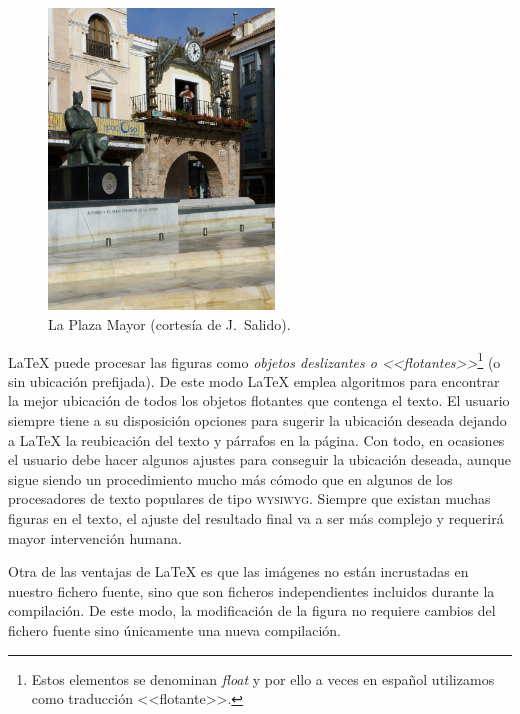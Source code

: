 \documentclass[11pt,a4paper]{article}
\begin{document}
\begin{figure}[hbt] %
	\centering %
	\includegraphics[height=8cm]{plazaCR} %
	\caption[Ejemplo de foto en formato jpg]{La Plaza Mayor (cortesía de J.~Salido).} %
	\label{fig:plazaCR} %
\end{figure}

\LaTeX{} puede procesar las figuras como \emph{objetos deslizantes o <<flotantes>>}\footnote{Estos elementos se denominan \textit{float} y por ello a veces en español utilizamos como traducción <<flotante>>.} (o sin ubicación prefijada). De este modo \LaTeX{} emplea algoritmos para encontrar la mejor ubicación de todos los objetos flotantes que contenga el texto. El usuario siempre tiene a su disposición opciones para sugerir la ubicación deseada dejando a \LaTeX{} la reubicación del texto y párrafos en la página. Con todo, en ocasiones el usuario debe hacer algunos ajustes para conseguir la ubicación deseada, aunque sigue siendo un procedimiento mucho más cómodo que en algunos de los procesadores de texto populares de tipo \textsc{wysiwyg}. Siempre que existan muchas figuras en el texto, el ajuste del resultado final va a ser más complejo y requerirá mayor intervención humana.

Otra de las ventajas de \LaTeX{} es que las imágenes no están incrustadas en nuestro fichero fuente, sino que son ficheros independientes incluidos durante la compilación. De este modo, la modificación de la figura no requiere cambios del fichero fuente sino únicamente una nueva compilación.
\end{document}
